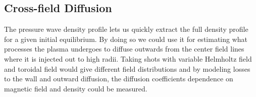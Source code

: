 \subsection{Cross-field Diffusion}

The pressure wave density profile lets us quickly extract the full density profile for a given initial equilibrium. By doing so we could use it for estimating what processes the plasma undergoes to diffuse outwards from the center field lines where it is injected out to high radii. Taking shots with variable Helmholtz field and toroidal field would give different field distributions and by modeling losses to the wall and outward diffusion, the diffusion coefficients dependence on magnetic field and density could be measured.
